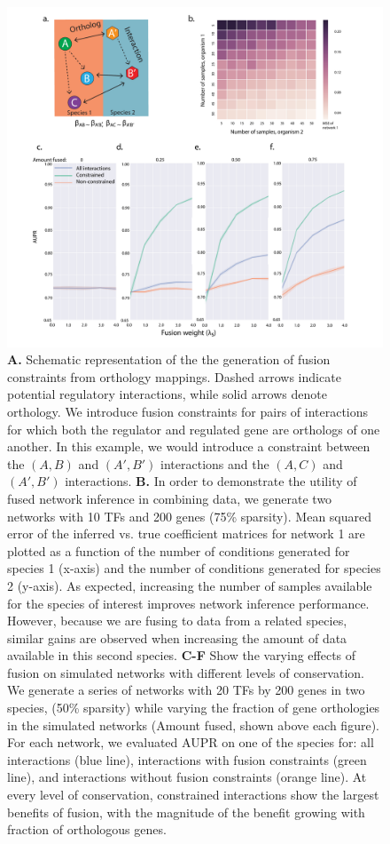 \documentclass[11pt]{article}
\begin{document}
\begin{figure}
\begin{center}
  \includegraphics[scale=0.30]{fig1.pdf}
  \caption{\label{fusion} \textbf{A.} Schematic representation of the the generation of fusion constraints from orthology mappings. Dashed arrows indicate potential regulatory interactions, while solid arrows denote orthology. We introduce fusion constraints for pairs of interactions for which both the regulator and regulated gene are orthologs of one another.   In this example, we would introduce a constraint between the $(A, B)$ and $(A', B')$ interactions and the $(A, C)$ and $(A', B')$ interactions. \textbf{B.} 
  In order to demonstrate the utility of fused network inference in combining data, we generate two networks with 10 TFs and 200 genes (75\% sparsity). Mean squared error of the inferred vs. true coefficient matrices for network 1 are plotted as a function of the number of conditions generated for species 1 (x-axis) and the number of conditions generated for species 2 (y-axis). 
  As expected, increasing the number of samples available for the species of interest improves network inference performance. 
  However, because we are fusing to data from a related species, similar gains are observed when increasing the amount of data available in this second species. 
  \textbf{C-F} Show the varying effects of fusion on simulated networks with different levels of conservation. We generate a series of networks with 20 TFs by 200 genes in two species, (50\% sparsity) while varying the fraction of gene orthologies in the simulated networks (Amount fused, shown above each figure). For each network, we evaluated AUPR on one of the species for: all interactions (blue line), interactions with fusion constraints (green line), and interactions without fusion constraints (orange line). At every level of conservation, constrained interactions show the largest benefits of fusion, with the magnitude of the benefit growing with fraction of orthologous genes. 
}
\end{center}
\end{figure}
\end{document}
